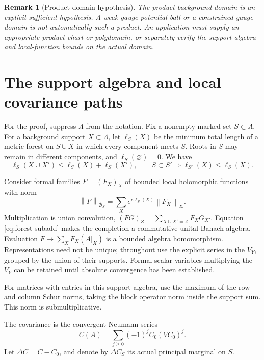 \documentclass[11pt]{article}
\newtheorem{remark}{Remark}
\newcommand{\Bcal}{\mathcal B}
\newcommand{\norm}[1]{\left\|#1\right\|}
\begin{document}
\begin{remark}[Product-domain hypothesis]
The product background domain is an explicit sufficient hypothesis.
A weak gauge-potential ball or a constrained gauge domain is not
automatically such a product. An application must supply an appropriate
product chart or polydomain, or separately verify the support algebra
and local-function bounds on the actual domain.
\end{remark}

\section{The support algebra and local covariance paths}

For the proof, suppress $\Lambda$ from the notation. Fix a nonempty
marked set $S\subset\Lambda$. For a background support $X\subset\Lambda$,
let $\ell_S(X)$ be the minimum total length of a metric forest on
$S\cup X$ in which every component meets $S$.
Roots in $S$ may remain in different components, and
$\ell_S(\varnothing)=0$. We have
\begin{equation}
 \ell_S(X\cup X')\le\ell_S(X)+\ell_S(X'),\qquad
 S\subset S'\Longrightarrow\ell_{S'}(X)\le\ell_S(X).
 \label{eq:forest-subadd}
\end{equation}

Consider formal families $F=(F_X)_X$ of bounded local holomorphic
functions with norm
\begin{equation}
 \norm{F}_{\Bcal_S}
       =\sum_Xe^{\kappa\ell_S(X)}\norm{F_X}_\infty.
 \label{eq:supportnorm}
\end{equation}
Multiplication is union convolution,
$(FG)_Z=\sum_{X\cup X'=Z}F_XG_{X'}$.
Equation \eqref{eq:forest-subadd} makes the completion a commutative
unital Banach algebra. Evaluation
$F\mapsto\sum_XF_X(A|_X)$ is a bounded algebra homomorphism.
Representations need not be unique; throughout use the explicit series
in the $V_Y$, grouped by the union of their supports. Formal scalar
variables multiplying the $V_Y$ can be retained until absolute
convergence has been established.

For matrices with entries in this support algebra, use the maximum of
the row and column Schur norms, taking the block operator norm inside
the support sum. This norm is submultiplicative.

The covariance is the convergent Neumann series
\begin{equation}
 C(A)=\sum_{j\ge0}(-1)^j C_0(VC_0)^j.
 \label{eq:neumann}
\end{equation}
Let $\Delta C=C-C_0$, and denote by $\Delta C_S$ its actual principal
marginal on $S$.
\end{document}
